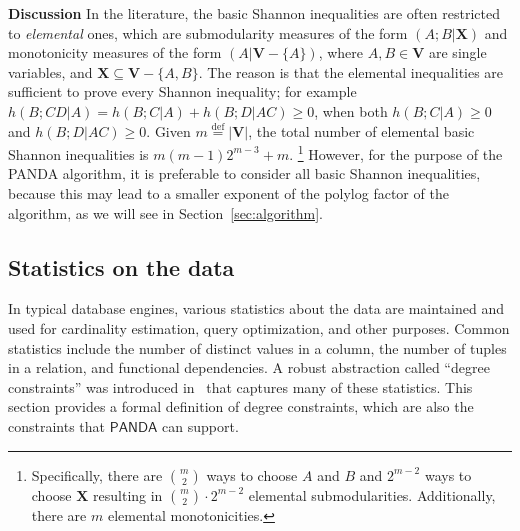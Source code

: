 \documentclass[10pt,a4paper]{article}
\newcommand{\set}[1]{\{#1\}}                    %
\newcommand{\defeq}{\stackrel{\text{def}}{=}}
\newcommand{\panda}{\textsf{PANDA}\xspace}
\begin{document}
{\bf Discussion} In the literature, the basic Shannon inequalities are
often restricted to {\em elemental} ones, which are submodularity
measures of the form $(A;B|\bm X)$ and monotonicity measures of the
form $(A|\bm V-\set{A})$, where $A,B \in \bm V$ are single variables,
and $\bm X\subseteq \bm V-\set{A,B}$. The reason is that the elemental
inequalities are sufficient to prove every Shannon inequality; for
example $h(B;CD|A) = h(B;C|A)+h(B;D|AC) \geq 0$, when both
$h(B;C|A)\geq 0$ and $h(B;D|AC)\geq 0$.
Given $m \defeq |\bm V|$, the total number of elemental
basic Shannon inequalities is $m(m-1)2^{m-3}+m$.
\footnote{Specifically, there are
${m \choose 2}$ ways to choose $A$ and $B$ and $2^{m-2}$ ways to choose $\bm X$
resulting in
${m \choose 2}\cdot 2^{m-2}$ elemental submodularities.
Additionally, there are $m$ elemental monotonicities.}
However, for the
purpose of the \panda algorithm, it is preferable to consider all basic
Shannon inequalities, because this may lead to a smaller exponent of
the polylog factor of the algorithm, as we will see in Section~\ref{sec:algorithm}.



\subsection{Statistics on the data}
\label{subsec:degrees}

In typical database engines, various statistics about the data are maintained and used for
cardinality estimation, query optimization, and other purposes. Common statistics include
the number of distinct values in a column, the number of tuples in a relation, and
functional dependencies. A robust abstraction called ``degree constraints'' was introduced
in~\cite{DBLP:conf/pods/Khamis0S17} that captures many of these statistics. This section
provides a formal definition of degree constraints, which are also the constraints that
$\panda$ can support.
\end{document}
